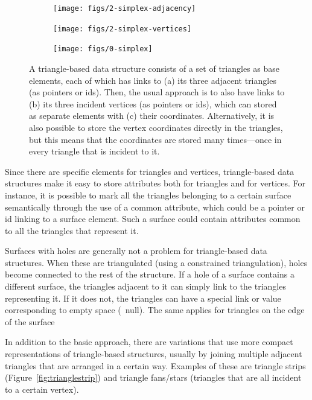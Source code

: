 \begin{figure}
\centering
\begin{subfigure}[b]{0.27\linewidth}
\texttt{[image: figs/2-simplex-adjacency]}
\caption{}%
\label{subfig:2-simplex-adjacency}
\end{subfigure}
\quad
\begin{subfigure}[b]{0.27\linewidth}
\texttt{[image: figs/2-simplex-vertices]}
\caption{}%
\label{subfig:2-simplex-vertices}
\end{subfigure}
\quad
\begin{subfigure}[b]{0.27\linewidth}
\texttt{[image: figs/0-simplex]}
\caption{}%
\label{subfig:0-simplex}
\end{subfigure}
\caption[A triangle-based data structure]{A triangle-based data structure consists of a set of triangles as base elements, each of which has links to (a) its three adjacent triangles (as pointers or ids).
Then, the usual approach is to also have links to (b) its three incident vertices (as pointers or ids), which can stored as separate elements with (c) their coordinates.
Alternatively, it is also possible to store the vertex coordinates directly in the triangles, but this means that the coordinates are stored many times---once in every triangle that is incident to it.}%
\label{fig:2-simplex}
\end{figure}

Since there are specific elements for triangles and vertices, triangle-based data structures make it easy to store attributes both for triangles and for vertices.
For instance, it is possible to mark all the triangles belonging to a certain surface semantically through the use of a common attribute, which could be a pointer or id linking to a surface element.
Such a surface could contain attributes common to all the triangles that represent it.

Surfaces with holes are generally not a problem for triangle-based data structures.
When these are triangulated (using a constrained triangulation), holes become connected to the rest of the structure.
If a hole of a surface contains a different surface, the triangles adjacent to it can simply link to the triangles representing it.
If it does not, the triangles can have a special link or value corresponding to empty space (\eg\ null).
The same applies for triangles on the edge of the surface

In addition to the basic approach, there are variations that use more compact representations of triangle-based structures, usually by joining multiple adjacent triangles that are arranged in a certain way.
Examples of these are triangle strips (Figure~\ref{fig:trianglestrip}) and triangle fans/stars (triangles that are all incident to a certain vertex).

